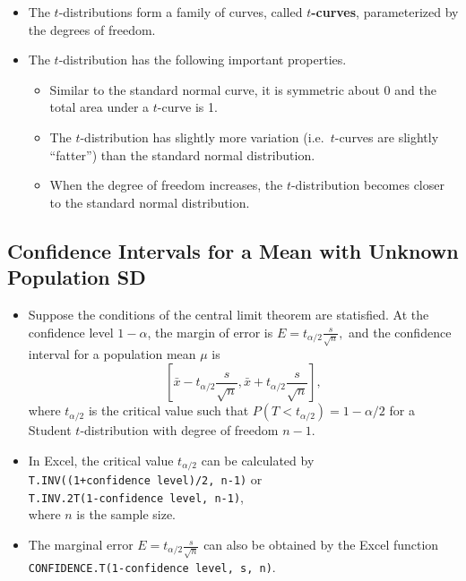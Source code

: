 \begin{itemize}
\item
  The \(t\)-distributions form a family of curves, called
  \textbf{\(t\)-curves}, parameterized by the
  degrees of freedom.
\item
  The \(t\)-distribution has the following important properties.

  \begin{itemize}
  \item
    Similar to the standard normal curve, it is symmetric about
    0 and the total area under a \(t\)-curve is
    1.
  \item
    The \(t\)-distribution has slightly more variation
    (i.e.~\(t\)-curves are slightly ``fatter'') than the
    standard normal distribution.
  \item
    When the degree of freedom increases, the
    \(t\)-distribution becomes closer to the standard normal
    distribution.
  \end{itemize}
\end{itemize}

\hypertarget{confidence-intervals-for-a-mean-with-unknown-population-sd}{%
\subsection{\texorpdfstring{Confidence Intervals for a Mean with
\textbf{Unknown} Population
SD}{Confidence Intervals for a Mean with Unknown Population SD}}\label{confidence-intervals-for-a-mean-with-unknown-population-sd}}

\begin{itemize}
\item
  Suppose the conditions of the central limit theorem are statisfied. At the
  confidence level \(1-\alpha\), the margin of error is
  \(E=t_{\alpha/2}\frac{s}{\sqrt{n}},\) and the confidence interval for
  a population mean \(\mu\) is
  \[\left[\bar{x}-t_{\alpha/2}\frac{s}{\sqrt{n}}, \bar{x}+t_{\alpha/2}\frac{s}{\sqrt{n}}\right],\]
  where \(t_{\alpha/2}\) is the critical value such that
  \(P(T<t_{\alpha/2})=1-\alpha/2\) for a Student \(t\)-distribution with
  degree of freedom \(n-1\).
\item
  In Excel, the critical value \(t_{\alpha/2}\) can be calculated by\\
  \texttt{T.INV((1+confidence\ level)/2,\ n-1)} or\\
  \texttt{T.INV.2T(1-confidence\ level,\ n-1)},\\ where \(n\) is the
  sample size.
\item
  The marginal error \(E=t_{\alpha/2}\frac{s}{\sqrt{n}}\) can also be
  obtained by the Excel function\\
  \texttt{CONFIDENCE.T(1-confidence\ level,\ s,\ n)}.
\end{itemize}


